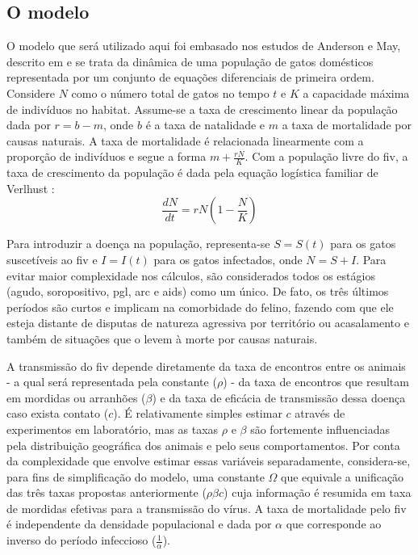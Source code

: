 \documentclass{article}
\begin{document}
\subsection{O modelo}
O modelo que será utilizado aqui foi embasado nos estudos de Anderson e May\cite{anderson}, descrito em \cite{base} e se trata da dinâmica de uma população de gatos domésticos representada por um conjunto de equações diferenciais de primeira ordem. Considere $N$ como  o número total de gatos no tempo $t$ e $K$ a capacidade máxima de indivíduos no habitat. Assume-se a taxa de crescimento linear da população dada por $r=b-m$, onde $b$ é a taxa de natalidade e $m$ a taxa de mortalidade por causas naturais. A taxa de mortalidade é relacionada linearmente com a proporção de indivíduos e segue a forma $
m+\frac{rN}{K}
$. Com a população livre do \gls{fiv}, a taxa de crescimento da população é dada pela equação logística familiar de Verlhust \cite{helmut}:
\begin{equation} \label{propcres}
\frac{dN}{dt} = rN\left( 1-\frac{N}{K} \right)
\end{equation}

\noindent Para introduzir a doença na população, representa-se $S = S(t)$ para os gatos suscetíveis ao \gls{fiv} e $I = I(t)$ para os gatos infectados, onde $N = S + I$. Para evitar maior complexidade nos cálculos, são considerados todos os estágios (agudo, soropositivo, \gls{pgl}, \gls{arc} e \gls{aids}) como um único. De fato, os três últimos períodos são curtos e implicam na comorbidade do felino, fazendo com que ele esteja distante de disputas de natureza agressiva por território ou acasalamento e também de situações que o levem à morte por causas naturais.

\noindent A transmissão do \gls{fiv} depende diretamente da taxa de encontros entre os animais - a qual será representada pela constante ($\rho$) - da taxa de encontros que resultam em mordidas ou arranhões ($\beta$) e da taxa de eficácia de transmissão dessa doença caso exista contato ($c$). É relativamente simples estimar $c$ através de experimentos em laboratório, mas as taxas $\rho$ e $\beta$ são fortemente influenciadas pela distribuição geográfica dos animais e pelo seus comportamentos. Por conta da complexidade que envolve estimar essas variáveis separadamente, considera-se, para fins de simplificação do modelo, uma constante $\Omega$ que equivale a unificação das três taxas propostas anteriormente ($\rho\beta c$) cuja informação é resumida em taxa de mordidas efetivas para a transmissão do vírus. A taxa de mortalidade pelo \gls{fiv} é independente da densidade populacional e dada por $\alpha$ que corresponde ao inverso do período infeccioso ($\frac{1}{\alpha}$).\\
\end{document}
